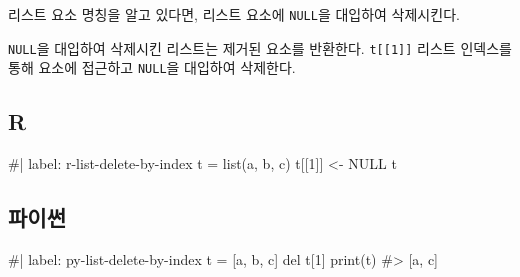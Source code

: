 \documentclass[
  letterpaper,
]{book}
\newenvironment{Shaded}{\begin{snugshade}}{\end{snugshade}}
\newcommand{\AttributeTok}[1]{\textcolor[rgb]{0.40,0.45,0.13}{#1}}
\newcommand{\CommentTok}[1]{\textcolor[rgb]{0.37,0.37,0.37}{#1}}
\newcommand{\ConstantTok}[1]{\textcolor[rgb]{0.56,0.35,0.01}{#1}}
\newcommand{\FunctionTok}[1]{\textcolor[rgb]{0.28,0.35,0.67}{#1}}
\newcommand{\NormalTok}[1]{\textcolor[rgb]{0.00,0.23,0.31}{#1}}
\newcommand{\OtherTok}[1]{\textcolor[rgb]{0.00,0.23,0.31}{#1}}
\newcommand{\SpecialCharTok}[1]{\textcolor[rgb]{0.37,0.37,0.37}{#1}}
\newcommand{\StringTok}[1]{\textcolor[rgb]{0.13,0.47,0.30}{#1}}
\begin{document}
리스트 요소 명칭을 알고 있다면, 리스트 요소에 \texttt{NULL}을 대입하여
삭제시킨다.

\begin{Shaded}
\end{Shaded}

\texttt{NULL}을 대입하여 삭제시킨 리스트는 제거된 요소를 반환한다.
\texttt{t{[}{[}1{]}{]}} 리스트 인덱스를 통해 요소에 접근하고
\texttt{NULL}을 대입하여 삭제한다. 

\subsection{R}

\begin{Shaded}
\begin{Highlighting}[]
\NormalTok{\#| label: r{-}list{-}delete{-}by{-}index}
\NormalTok{t = list(\textquotesingle{}a\textquotesingle{}, \textquotesingle{}b\textquotesingle{}, \textquotesingle{}c\textquotesingle{})}
\NormalTok{t[[1]] \textless{}{-} NULL}
\NormalTok{t}
\end{Highlighting}
\end{Shaded}

\subsection{파이썬}

\begin{Shaded}
\begin{Highlighting}[]
\NormalTok{\#| label: py{-}list{-}delete{-}by{-}index}
\NormalTok{t = [\textquotesingle{}a\textquotesingle{}, \textquotesingle{}b\textquotesingle{}, \textquotesingle{}c\textquotesingle{}]}
\NormalTok{del t[1]}
\NormalTok{print(t)}
\NormalTok{\#\textgreater{} [\textquotesingle{}a\textquotesingle{}, \textquotesingle{}c\textquotesingle{}]}
\end{Highlighting}
\end{Shaded}
\end{document}
